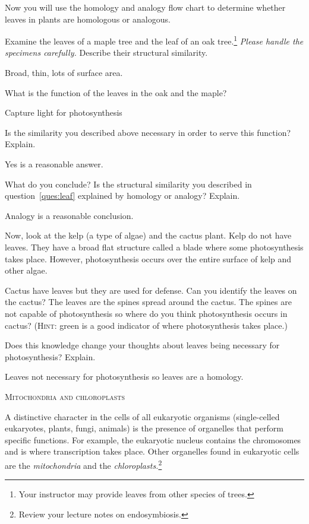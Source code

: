 \documentclass[12pt, hidelinks]{exam}
\newcommand*\AnswerBox[2]{%
    \parbox[t][#1]{0.92\textwidth}{%
    \begin{solution}#2\end{solution}}
    \vspace{\stretch{1}}
}
\begin{document}
\begin{questions}
Now you will use the homology and analogy flow chart to determine whether leaves in plants are homologous or analogous.

\question\label{ques:leaf}
Examine the leaves of a maple tree and the leaf of
an oak tree.\footnote{Your instructor may provide leaves from other species of trees.} \emph{Please
handle the specimens carefully.} Describe their structural similarity.

\AnswerBox{3\baselineskip}{Broad, thin, lots of surface area.}

\question
What is the function of the leaves in the oak and the maple?

\AnswerBox{4\baselineskip}{Capture light for photosynthesis}

\question
Is the similarity you described above necessary in order to serve
this function? Explain. 

\AnswerBox{4\baselineskip}{Yes is a reasonable answer.}

\question
What do you conclude? Is the structural similarity you described in
question~\ref{ques:leaf} explained by homology or analogy? Explain.

\AnswerBox{4\baselineskip}{Analogy is a reasonable conclusion.}

\newpage

Now, look at the kelp (a type of algae) and the cactus plant. Kelp do 
not have leaves. They have a broad flat structure called a blade where
some photosynthesis takes place. However, photosynthesis occurs over
the entire surface of kelp and other algae.

Cactus have leaves but they are used for defense. Can you identify the leaves on the
cactus? The leaves are the spines spread around the cactus. The spines are not
capable of photosynthesis so where do you think photosynthesis occurs in cactus? 
(\textsc{Hint:} green is a good indicator of where photosynthesis takes place.)


\question
Does this knowledge change your thoughts about leaves being necessary for
photosynthesis? Explain. %

\AnswerBox{3\baselineskip}{Leaves not necessary for photosynthesis so leaves are a homology.}

\bigskip

\textsc{Mitochondria and chloroplasts}

\bigskip

A distinctive character in the cells of all eukaryotic organisms 
(single-celled eukaryotes, plants, fungi, animals)  is the presence of 
organelles that perform specific functions. For example, the eukaryotic 
nucleus contains the chromosomes and is where transcription takes place. 
Other organelles found in eukaryotic cells are the \emph{mitochondria} and
the \emph{chloroplasts.}\footnote{Review your lecture notes on endosymbiosis.}


\end{questions}
\end{document}
